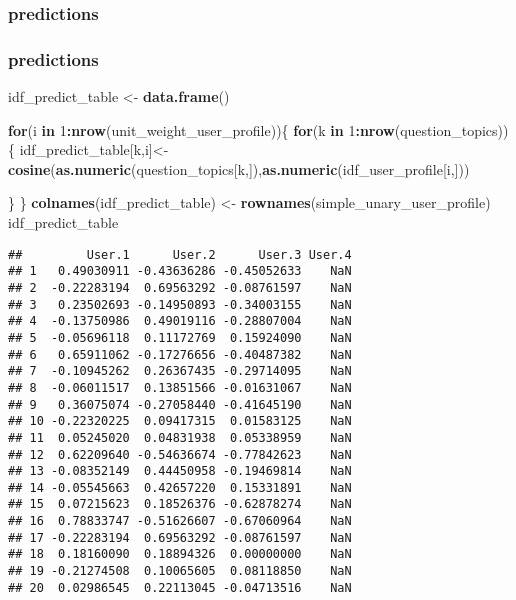 \documentclass[]{article}
\newenvironment{Shaded}{\begin{snugshade}}{\end{snugshade}}
\newcommand{\ControlFlowTok}[1]{\textcolor[rgb]{0.13,0.29,0.53}{\textbf{#1}}}
\newcommand{\DecValTok}[1]{\textcolor[rgb]{0.00,0.00,0.81}{#1}}
\newcommand{\KeywordTok}[1]{\textcolor[rgb]{0.13,0.29,0.53}{\textbf{#1}}}
\newcommand{\NormalTok}[1]{#1}
\newcommand{\OperatorTok}[1]{\textcolor[rgb]{0.81,0.36,0.00}{\textbf{#1}}}
\newcommand{\StringTok}[1]{\textcolor[rgb]{0.31,0.60,0.02}{#1}}
\begin{document}
\hypertarget{predictions-1}{%
\subsubsection{predictions}\label{predictions-1}}

\hypertarget{predictions-2}{%
\subsubsection{predictions}\label{predictions-2}}

\begin{Shaded}
\begin{Highlighting}[]
\NormalTok{idf_predict_table <-}\StringTok{ }\KeywordTok{data.frame}\NormalTok{()}


\ControlFlowTok{for}\NormalTok{(i }\ControlFlowTok{in} \DecValTok{1}\OperatorTok{:}\KeywordTok{nrow}\NormalTok{(unit_weight_user_profile))\{}
  \ControlFlowTok{for}\NormalTok{(k }\ControlFlowTok{in} \DecValTok{1}\OperatorTok{:}\KeywordTok{nrow}\NormalTok{(question_topics))\{}
\NormalTok{    idf_predict_table[k,i]<-}\StringTok{ }\KeywordTok{cosine}\NormalTok{(}\KeywordTok{as.numeric}\NormalTok{(question_topics[k,]),}\KeywordTok{as.numeric}\NormalTok{(idf_user_profile[i,]))}
  
\NormalTok{  \}}
\NormalTok{\}}
\KeywordTok{colnames}\NormalTok{(idf_predict_table) <-}\StringTok{ }\KeywordTok{rownames}\NormalTok{(simple_unary_user_profile)}
\NormalTok{idf_predict_table}
\end{Highlighting}
\end{Shaded}

\begin{verbatim}
##         User.1      User.2      User.3 User.4
## 1   0.49030911 -0.43636286 -0.45052633    NaN
## 2  -0.22283194  0.69563292 -0.08761597    NaN
## 3   0.23502693 -0.14950893 -0.34003155    NaN
## 4  -0.13750986  0.49019116 -0.28807004    NaN
## 5  -0.05696118  0.11172769  0.15924090    NaN
## 6   0.65911062 -0.17276656 -0.40487382    NaN
## 7  -0.10945262  0.26367435 -0.29714095    NaN
## 8  -0.06011517  0.13851566 -0.01631067    NaN
## 9   0.36075074 -0.27058440 -0.41645190    NaN
## 10 -0.22320225  0.09417315  0.01583125    NaN
## 11  0.05245020  0.04831938  0.05338959    NaN
## 12  0.62209640 -0.54636674 -0.77842623    NaN
## 13 -0.08352149  0.44450958 -0.19469814    NaN
## 14 -0.05545663  0.42657220  0.15331891    NaN
## 15  0.07215623  0.18526376 -0.62878274    NaN
## 16  0.78833747 -0.51626607 -0.67060964    NaN
## 17 -0.22283194  0.69563292 -0.08761597    NaN
## 18  0.18160090  0.18894326  0.00000000    NaN
## 19 -0.21274508  0.10065605  0.08118850    NaN
## 20  0.02986545  0.22113045 -0.04713516    NaN
\end{verbatim}
\end{document}
